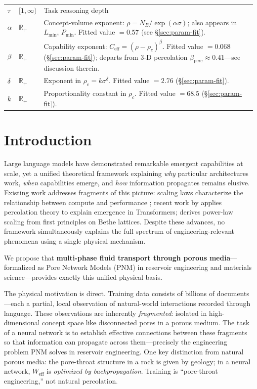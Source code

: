 \documentclass[11pt,a4paper]{article}
\newcommand{\Weff}{W_{\text{eff}}}
\newcommand{\Ceff}{C_{\text{eff}}}
\newcommand{\rhoc}{\rho_c}
\begin{document}
\begin{table}[H]
\begin{tabular}{llp{7cm}}
$\tau$      & $[1,\infty)$      & Task reasoning depth \\
$\alpha$    & $\mathbb{R}_{+}$  & Concept-volume exponent: $\rho = N_B/\exp(\alpha\sigma)$; also appears in $L_{\min}$, $P_{\min}$. Fitted value $= 0.57$ (see \S\ref{sec:param-fit}). \\
$\beta$     & $\mathbb{R}_{+}$  & Capability exponent: $\Ceff = (\rho-\rhoc)^\beta$. Fitted value $= 0.068$ (\S\ref{sec:param-fit}); departs from 3-D percolation $\beta_{\text{perc}}\approx 0.41$---see discussion therein. \\
$\delta$    & $\mathbb{R}_{+}$  & Exponent in $\rho_c = k\sigma^\delta$. Fitted value $= 2.76$ (\S\ref{sec:param-fit}). \\
$k$         & $\mathbb{R}_{+}$  & Proportionality constant in $\rho_c$. Fitted value $= 68.5$ (\S\ref{sec:param-fit}). \\
\bottomrule
\end{tabular}
\end{table}

\section{Introduction}

Large language models have demonstrated remarkable emergent capabilities at
scale, yet a unified theoretical framework explaining \emph{why} particular
architectures work, \emph{when} capabilities emerge, and \emph{how} information
propagates remains elusive. Existing work addresses fragments of this picture:
scaling laws characterize the relationship between compute and performance
\citep{kaplan2020scaling, hoffmann2022chinchilla}; recent work by
\citet{lubana2024percolation} applies percolation theory to explain emergence
in Transformers; \citet{brill2024scaling} derives power-law scaling from
first principles on Bethe lattices. Despite these advances, no framework
simultaneously explains the full spectrum of engineering-relevant phenomena
using a single physical mechanism.

We propose that \textbf{multi-phase fluid transport through porous media}---
formalized as Pore Network Models (PNM) in reservoir engineering and materials
science---provides exactly this unified physical basis.

The physical motivation is direct.
Training data consists of billions of documents---each a partial, local
observation of natural-world interactions recorded through language.
These observations are inherently \emph{fragmented}: isolated in
high-dimensional concept space like disconnected pores in a porous medium.
The task of a neural network is to establish effective connections between
these fragments so that information can propagate across them---precisely
the engineering problem PNM solves in reservoir engineering.
One key distinction from natural porous media: the pore-throat structure
in a rock is given by geology; in a neural network, $\Weff$ is
\emph{optimized by backpropagation}. Training is ``pore-throat engineering,''
not natural percolation.
\end{document}
